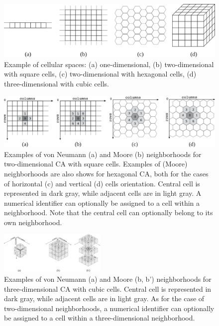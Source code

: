     \begin{figure}
      \begin{center}
        \includegraphics[scale=0.5]{./images/cellularspaces.png}
        \caption{Example of cellular spaces: (a) one-dimensional, (b)
          two-dimensional with square cells, (c) two-dimensional with
          hexagonal cells, (d) three-dimensional with cubic cells.}
        \label{fig:cellularspaces}
      \end{center}
    \end{figure}

    \begin{figure}
      \begin{center}
        \includegraphics[scale=0.5]{./images/2Dneighborhoods.png}
        \caption{Examples of von Neumann (a) and Moore (b)
          neighborhoods for two-dimensional CA with square
          cells. Examples of (Moore) neighborhoods are also shows for
          hexagonal CA, both for the cases of horizontal (c) and
          vertical (d) cells orientation. Central cell is represented
          in dark gray, while adjacent cells are in light gray. A
          numerical identifier can optionally be assigned to a cell
          within a neighborhood. Note that the central cell can
          optionally belong to its own neighborhood.}
        \label{fig:2Dneighborhood}
      \end{center}
    \end{figure}

    \begin{figure}
      \begin{center}
        \includegraphics[width=0.45454545\textwidth]{./images/3Dneighborhoods.png}
        \caption{Examples of von Neumann (a) and Moore (b, b')
          neighborhoods for three-dimensional CA with cubic
          cells. Central cell is represented in dark gray, while
          adjacent cells are in light gray. As for the case of
          two-dimensional neighborhoods, a numerical identifier can
          optionally be assigned to a cell within a three-dimensional
          neighborhood.}
        \label{fig:3Dneighborhood}
      \end{center}
    \end{figure}

